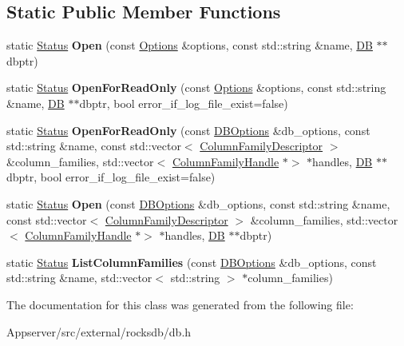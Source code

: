 \subsection*{Static Public Member Functions}
\begin{DoxyCompactItemize}
\item 
static \hyperlink{classrocksdb_1_1Status}{Status} {\bfseries Open} (const \hyperlink{structrocksdb_1_1Options}{Options} \&options, const std\+::string \&name, \hyperlink{classrocksdb_1_1DB}{DB} $\ast$$\ast$dbptr)\hypertarget{classrocksdb_1_1DB_aa4cd208caf75bff0027149ec7f0b0171}{}\label{classrocksdb_1_1DB_aa4cd208caf75bff0027149ec7f0b0171}

\item 
static \hyperlink{classrocksdb_1_1Status}{Status} {\bfseries Open\+For\+Read\+Only} (const \hyperlink{structrocksdb_1_1Options}{Options} \&options, const std\+::string \&name, \hyperlink{classrocksdb_1_1DB}{DB} $\ast$$\ast$dbptr, bool error\+\_\+if\+\_\+log\+\_\+file\+\_\+exist=false)\hypertarget{classrocksdb_1_1DB_a128d6ca12398890b3a52279fa5e32731}{}\label{classrocksdb_1_1DB_a128d6ca12398890b3a52279fa5e32731}

\item 
static \hyperlink{classrocksdb_1_1Status}{Status} {\bfseries Open\+For\+Read\+Only} (const \hyperlink{structrocksdb_1_1DBOptions}{D\+B\+Options} \&db\+\_\+options, const std\+::string \&name, const std\+::vector$<$ \hyperlink{structrocksdb_1_1ColumnFamilyDescriptor}{Column\+Family\+Descriptor} $>$ \&column\+\_\+families, std\+::vector$<$ \hyperlink{classrocksdb_1_1ColumnFamilyHandle}{Column\+Family\+Handle} $\ast$$>$ $\ast$handles, \hyperlink{classrocksdb_1_1DB}{DB} $\ast$$\ast$dbptr, bool error\+\_\+if\+\_\+log\+\_\+file\+\_\+exist=false)\hypertarget{classrocksdb_1_1DB_a2d287fcd25a0d283f9c9b0209313506d}{}\label{classrocksdb_1_1DB_a2d287fcd25a0d283f9c9b0209313506d}

\item 
static \hyperlink{classrocksdb_1_1Status}{Status} {\bfseries Open} (const \hyperlink{structrocksdb_1_1DBOptions}{D\+B\+Options} \&db\+\_\+options, const std\+::string \&name, const std\+::vector$<$ \hyperlink{structrocksdb_1_1ColumnFamilyDescriptor}{Column\+Family\+Descriptor} $>$ \&column\+\_\+families, std\+::vector$<$ \hyperlink{classrocksdb_1_1ColumnFamilyHandle}{Column\+Family\+Handle} $\ast$$>$ $\ast$handles, \hyperlink{classrocksdb_1_1DB}{DB} $\ast$$\ast$dbptr)\hypertarget{classrocksdb_1_1DB_a45a1173260f060715c952003c59846dc}{}\label{classrocksdb_1_1DB_a45a1173260f060715c952003c59846dc}

\item 
static \hyperlink{classrocksdb_1_1Status}{Status} {\bfseries List\+Column\+Families} (const \hyperlink{structrocksdb_1_1DBOptions}{D\+B\+Options} \&db\+\_\+options, const std\+::string \&name, std\+::vector$<$ std\+::string $>$ $\ast$column\+\_\+families)\hypertarget{classrocksdb_1_1DB_a30967758ca8b4b3589b444e3ab1d2545}{}\label{classrocksdb_1_1DB_a30967758ca8b4b3589b444e3ab1d2545}

\end{DoxyCompactItemize}


The documentation for this class was generated from the following file\+:\begin{DoxyCompactItemize}
\item 
Appserver/src/external/rocksdb/db.\+h\end{DoxyCompactItemize}
